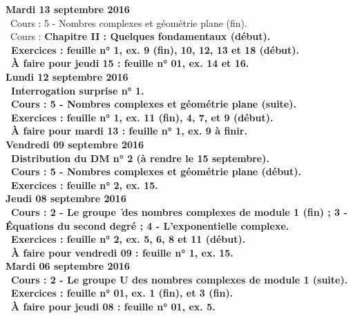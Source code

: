 \documentclass[12pt,a4paper]{article}
\begin{document}
\noindent\textbf{\bf Mardi 13 septembre 2016}\\
\bu\ Cours : 5 - Nombres complexes et géométrie plane (fin).\\
\bu\ Cours : \bf Chapitre II \rm : Quelques fondamentaux (début).\\
\bu\ Exercices : feuille n° 1, ex. 9 (fin), 10, 12, 13 et 18 (début).\\
\bu\ À faire pour jeudi 15 : feuille n° 01, ex. 14 et 16.\vspace{.4cm}\\

\noindent\textbf{\bf Lundi 12 septembre 2016}\\
\bu\ Interrogation surprise n° 1.\\
\bu\ Cours : 5 - Nombres complexes et géométrie plane (suite).\\
\bu\ Exercices : feuille n° 1, ex. 11 (fin), 4, 7, et 9 (début).\\
\bu\ À faire pour mardi 13 : feuille n° 1, ex. 9 à finir.\vspace{.4cm}\\
 
\noindent\textbf{Vendredi 09 septembre 2016}\\
\bu\ Distribution du DM n° 2 (à rendre le 15 septembre).\\
\bu\ Cours : 5 - Nombres complexes et géométrie plane (début).\\
\bu\ Exercices : feuille n° 2, ex. 15.\vspace{.4cm}\\

\noindent\textbf{\bf Jeudi 08 septembre 2016}\\
\bu\ Cours : 2 - Le groupe \U\ des nombres complexes de 
module 1 (fin) ; 3 - Équations du second degré ; 4 - L'exponentielle complexe.\\
\bu\ Exercices : feuille n° 2, ex. 5, 6, 8 et 11 (début).\\
\bu\ À faire pour vendredi 09 : feuille n° 1, ex. 15.\vspace{.4cm}\\
  
\noindent\textbf{\bf Mardi 06 septembre 2016}\\
\bu\ Cours : 2 - Le groupe \textbf{U} des nombres complexes de 
module 1 (suite).\\
\bu\ Exercices : feuille n° 01, ex. 1 (fin), et 3 (fin).\\
\bu\ À faire pour jeudi 08 : feuille n° 01, ex. 5.\vspace{.4cm}\\
\end{document}
